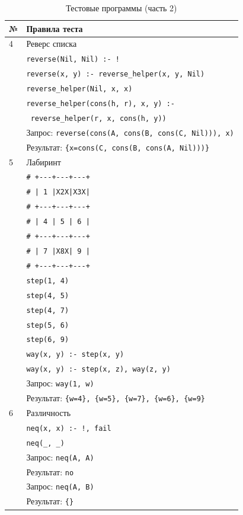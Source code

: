 \begin{table}[ht]
  \caption{Тестовые программы (часть 2)}
  \label{tbl:tests-2}
  \centering
  \begin{tabular}{|l|l|}
    \hline
    \textbf{№} & \textbf{Правила теста} \\
    \hline
    \hline
    4 & Реверс списка \\
    \hline
    & \texttt{reverse(Nil, Nil) :- !} \\
    & \texttt{reverse(x, y) :- reverse\_helper(x, y, Nil)} \\
    & \texttt{reverse\_helper(Nil, x, x)} \\
    & \texttt{reverse\_helper(cons(h, r), x, y) :-} \\
    & \texttt{    reverse\_helper(r, x, cons(h, y))} \\
    \hline
    & Запрос: \texttt{reverse(cons(A, cons(B, cons(C, Nil))), x)} \\
    & Результат: \texttt{\{x=cons(C, cons(B, cons(A, Nil)))\}} \\
    \hline
    \hline
    5 & Лабиринт \\
    \hline
    & \texttt{\# +-\--\--+-\--\--+-\--\--+} \\
    & \texttt{\# | 1 |X2X|X3X|} \\
    & \texttt{\# +-\--\--+-\--\--+-\--\--+} \\
    & \texttt{\# | 4 | 5 | 6 |} \\
    & \texttt{\# +-\--\--+-\--\--+-\--\--+} \\
    & \texttt{\# | 7 |X8X| 9 |} \\
    & \texttt{\# +-\--\--+-\--\--+-\--\--+} \\
    & \texttt{step(1, 4)} \\
    & \texttt{step(4, 5)} \\
    & \texttt{step(4, 7)} \\
    & \texttt{step(5, 6)} \\
    & \texttt{step(6, 9)} \\
    & \texttt{way(x, y) :- step(x, y)} \\
    & \texttt{way(x, y) :- step(x, z), way(z, y)} \\
    \hline
    & Запрос: \texttt{way(1, w)} \\
    & Результат: \texttt{\{w=4\}, \{w=5\}, \{w=7\}, \{w=6\}, \{w=9\}} \\
    \hline
    \hline
    6 & Различность \\
    \hline
    & \texttt{neq(x, x) :- !, fail} \\
    & \texttt{neq(\_, \_)} \\
    \hline
    & Запрос: \texttt{neq(A, A)} \\
    & Результат: \texttt{no} \\
    \hline
    & Запрос: \texttt{neq(A, B)} \\
    & Результат: \texttt{\{\}} \\
    \hline
  \end{tabular}
\end{table}

